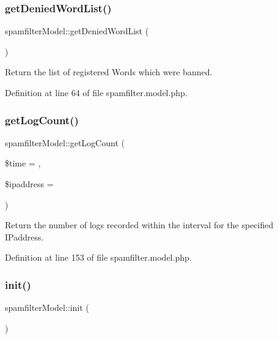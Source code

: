 \subsubsection{\texorpdfstring{get\+Denied\+Word\+List()}{getDeniedWordList()}}
{\footnotesize\ttfamily spamfilter\+Model\+::get\+Denied\+Word\+List (\begin{DoxyParamCaption}{ }\end{DoxyParamCaption})}



Return the list of registered Words which were banned. 



Definition at line 64 of file spamfilter.\+model.\+php.

\mbox{\label{classspamfilterModel_a3f46333476c1f3e3feba759dca738288}} 
\subsubsection{\texorpdfstring{get\+Log\+Count()}{getLogCount()}}
{\footnotesize\ttfamily spamfilter\+Model\+::get\+Log\+Count (\begin{DoxyParamCaption}\item[{}]{\$time = {},  }\item[{}]{\$ipaddress = {\ttfamily \textquotesingle{}\textquotesingle{}} }\end{DoxyParamCaption})}



Return the number of logs recorded within the interval for the specified I\+Paddress. 



Definition at line 153 of file spamfilter.\+model.\+php.

\mbox{\label{classspamfilterModel_ab4bc83fb75d4c469e674e46ae0e22b52}} 
\subsubsection{\texorpdfstring{init()}{init()}}
{\footnotesize\ttfamily spamfilter\+Model\+::init (\begin{DoxyParamCaption}{ }\end{DoxyParamCaption})}



